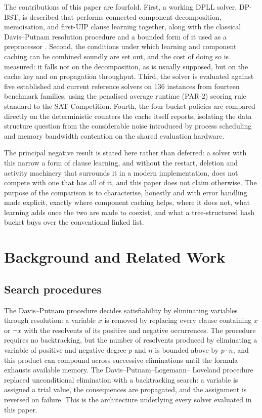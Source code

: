 \documentclass[conference]{IEEEtran}
\begin{document}
The contributions of this paper are fourfold. First, a working DPLL solver, DP-BST, is described
that performs connected-component decomposition, memoisation, and first-UIP clause learning
together, along with the classical Davis--Putnam resolution procedure \cite{davis1960} and a
bounded form of it used as a preprocessor \cite{een2005}. Second, the conditions under which
learning and component caching can be combined soundly are set out, and the cost of doing so is
measured: it falls not on the decomposition, as is usually supposed, but on the cache key and on
propagation throughput. Third, the solver is evaluated against five established and current
reference solvers on 136 instances from fourteen benchmark families, using the penalised average
runtime (PAR-2) scoring rule standard to the SAT Competition. Fourth, the four bucket policies are
compared directly on the deterministic counters the cache itself reports, isolating the data
structure question from the considerable noise introduced by process scheduling and memory
bandwidth contention on the shared evaluation hardware.

The principal negative result is stated here rather than deferred: a solver with this narrow a
form of clause learning, and without the restart, deletion and activity machinery that surrounds
it in a modern implementation, does not compete with one that has all of it, and this paper does
not claim otherwise. The purpose of the comparison is to characterise, honestly and with error
handling made explicit, exactly where component caching helps, where it does not, what learning
adds once the two are made to coexist, and what a tree-structured hash bucket buys over the
conventional linked list.

\section{Background and Related Work}

\subsection{Search procedures}

The Davis--Putnam procedure \cite{davis1960} decides satisfiability by eliminating variables
through resolution: a variable $x$ is removed by replacing every clause containing $x$ or
$\lnot x$ with the resolvents of its positive and negative occurrences. The procedure requires no
backtracking, but the number of resolvents produced by eliminating a variable of positive and
negative degree $p$ and $n$ is bounded above by $p \cdot n$, and this product can compound across
successive eliminations until the formula exhausts available memory. The Davis--Putnam--Logemann--
Loveland procedure \cite{davis1962} replaced unconditional elimination with a backtracking search:
a variable is assigned a trial value, the consequences are propagated, and the assignment is
reversed on failure. This is the architecture underlying every solver evaluated in this paper.
\end{document}
